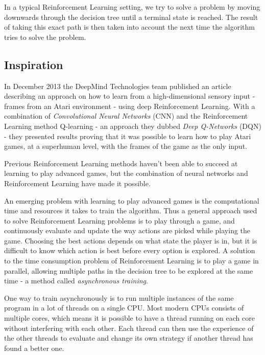 \documentclass[11pt]{article}
\begin{document}
In a typical Reinforcement Learning setting, we try to solve a problem
by moving downwards through the decision tree until a terminal state is reached.
The result of taking this exact path is then
taken into account the next time the algorithm tries to solve the problem.

\subsection{Inspiration}

In December 2013 the DeepMind Technologies team published an article
describing an approach on how to learn from a high-dimensional sensory input -
frames from an Atari environment -
using deep Reinforcement Learning\cite{dqn}.
With a combination of \textit{Convolutional Neural Networks} (CNN) and
the Reinforcement Learning method Q-learning\cite{RLbook} - an approach they
dubbed \textit{Deep Q-Networks} (DQN) - they
presented results proving that it was possible to learn how to play Atari
games, at a superhuman level, with the frames of the game as the only input.

Previous Reinforcement Learning methods haven't been able to succeed at learning to play
advanced games, but the combination of neural networks and
Reinforcement Learning have made it possible.

An emerging problem with learning to play advanced games is the computational time and
resources it takes to train the algorithm.
Thus a general approach used to solve Reinforcement Learning problems is to
play through a game, and continuously evaluate and update the way actions are picked
while playing the game.
Choosing the best actions depends on what state the player is in, but it is difficult to
know which action is best before every option is explored.
A solution to the time consumption problem of Reinforcement Learning
is to play a game in parallel,
allowing multiple paths in the decision tree to be explored at the same time -
a method called \textit{asynchronous training}.


One way to train asynchronously is to run multiple instances of the same program
in a lot of threads on a single CPU.
Most modern CPUs consists of multiple cores, which means it is possible to have a thread
running on each core without interfering with each other.
Each thread can then use the experience of the other threads 
to evaluate and change its own strategy if another thread
has found a better one.
\end{document}
